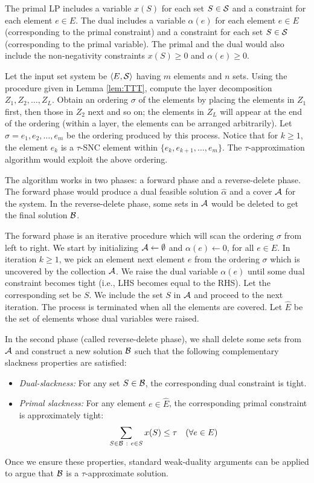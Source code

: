 \documentclass[11pt]{article}
\newcommand{\calA} {{\cal A}}
\newcommand{\calB} {{\cal B}}
\newcommand{\calS} {{\cal S}}
\newcommand{\wh}[1] {\widehat{#1}}
\newcommand{\pair}[2] {\langle #1, #2\rangle}
\begin{document}
The primal LP includes a variable $x(S)$ for each set $S\in \calS$
and a constraint for each element $e\in E$.
The dual includes a variable $\alpha(e)$ for each element $e\in E$ (corresponding to the primal constraint)
and a constraint for each set $S\in \calS$ (corresponding to the primal variable).
The primal and the dual would also include the non-negativity constraints $x(S)\geq 0$ and $\alpha(e)\geq 0$.

Let the input set system be $\pair{E}{\calS}$ having $m$ elements and $n$ sets.
Using the procedure given in Lemma \ref{lem:TTT}, compute the layer decomposition $Z_1, Z_2, \ldots, Z_L$.
Obtain an ordering $\sigma$ of the elements by placing the elements in $Z_1$ first,
then those in $Z_2$ next and so on; the elements in $Z_L$ will appear at the end of the ordering
(within a layer, the elements can be arranged arbitrarily).
Let $\sigma=e_1, e_2, \ldots, e_m$ be the ordering produced by this process.
Notice that for $k\geq 1$, the element $e_k$ is a $\tau$-SNC element within $\{e_k, e_{k+1}, \ldots, e_m\}$.
The $\tau$-approximation algorithm would exploit the above ordering.

The algorithm works in two phases: a forward phase and a reverse-delete phase.
The forward phase would produce a dual feasible solution $\wh{\alpha}$ and a cover $\calA$ for the system.
In the reverse-delete phase, some sets in $\calA$ would be deleted to get the final solution $\calB$.

The forward phase is an iterative procedure which will scan the ordering $\sigma$ from left to right. 
We start by initializing $\calA\leftarrow \emptyset$
and $\alpha(e)\leftarrow 0$, for all $e\in E$. 
In iteration $k\geq 1$, we pick an element next element $e$ from the ordering $\sigma$
which is uncovered by the collection $\calA$. We raise the dual variable $\alpha(e)$ until
some dual constraint becomes tight (i.e., LHS becomes equal to the RHS). 
Let the corresponding set be $S$. We include the set $S$ in $\calA$ and proceed to the next iteration.
The process is terminated when all the elements are covered. 
Let $\wh{E}$ be the set of elements whose dual variables were raised.

In the second phase (called reverse-delete phase), 
we shall delete some sets from $\calA$ and construct a new solution $\calB$ such that the following 
complementary slackness properties are satisfied:
\begin{itemize}
\item 
{\em Dual-slackness:} For any set $S\in \calB$, the corresponding dual constraint is tight.
\item 
{\em Primal slackness:} For any element $e \in \wh{E}$, the corresponding primal constraint is approximately tight:
\begin{eqnarray}
\label{eqn:seq-tau}
\sum_{S\in \calB~:~e \in S} x(S)  \leq  \tau \quad  (\forall e\in E) 
\end{eqnarray}
\end{itemize}
Once we ensure these properties, standard weak-duality arguments can be applied
to argue that $\calB$ is a $\tau$-approximate solution.
\end{document}
